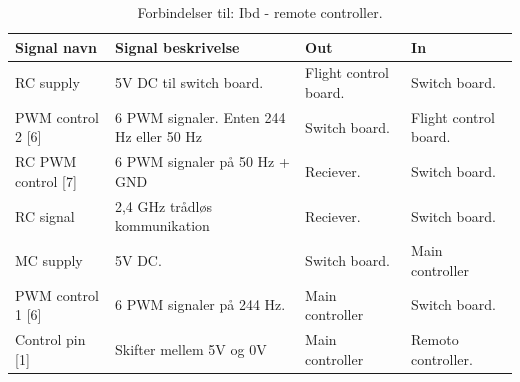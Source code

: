 \begin{table}[H]
	\centering
		\begin{tabular}{|p{3.5 cm}|p{4.5 cm}|p{2.6 cm}|p{2.6 cm}|} 
		\hline
			\textbf{Signal navn} 	& \textbf{Signal beskrivelse}		& \textbf{Out} 				& \textbf{In}     \\ \hline
			RC supply & 5V DC til switch board. & Flight control board. & Switch board.	\\ \hline	
			PWM control 2 [6] & 6 PWM signaler. \newline Enten 244 Hz eller 50 Hz & Switch board. & Flight control board.				\\ \hline
					
			RC PWM control [7] & 6 PWM signaler på 50 Hz \newline + GND & Reciever. & Switch board.				\\ \hline
			RC signal & 2,4 GHz trådløs \newline kommunikation & Reciever. & Switch board.				\\ \hline
			
			MC supply 			& 5V DC. 						& Switch board.  & Main controller	\\ \hline
			PWM control 1 [6] 	& 6 PWM signaler på 244 Hz. 	& Main controller & Switch board. \\ \hline
			Control pin [1]		& Skifter mellem 5V og 0V		& Main controller	& Remoto \newline  controller.    \\ \hline
		\end{tabular}
	\caption{Forbindelser til: Ibd - remote controller. }
	\label{tab:ibd_remote_controller}
\end{table}



